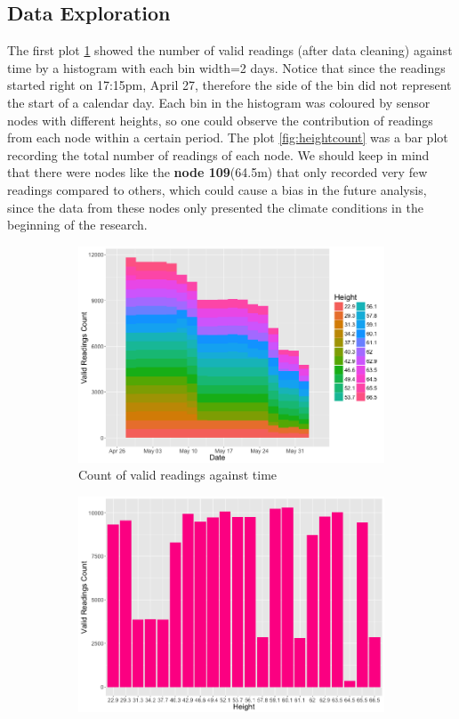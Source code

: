 \documentclass[11pt]{article}
\begin{document}
{\subsection{Data Exploration}
The first plot \ref{fig:readingcount} showed the number of valid readings (after data cleaning) against time by a histogram with each bin width=2 days. Notice that since the readings started right on 17:15pm, April 27, therefore the side of the bin did not represent the start of a calendar day. Each bin in the histogram was coloured by sensor nodes with different heights, so one could observe the contribution of readings from each node within a certain period. The plot \ref{fig:heightcount} was a bar plot recording the total number of readings of each node. We should keep in mind that there were nodes like the \textbf{node 109}(64.5m) that only recorded very few readings compared to others, which could cause a bias in the future analysis, since the data from these nodes only presented the climate conditions in the beginning of the research.
\begin{figure}[H]
\centering
\begin{subfigure}{.5\textwidth}
\centering
\includegraphics [width=0.9\linewidth,height=0.45\linewidth]{reading_count.png}
\caption{Count of valid readings against time}
\label{fig:readingcount}
\end{subfigure}%
\begin{subfigure}{.5\textwidth}
\centering
\includegraphics[width=0.9\linewidth,height=0.45\linewidth]{height_count.png}

\end{subfigure}
\end{figure}}
\end{document}
